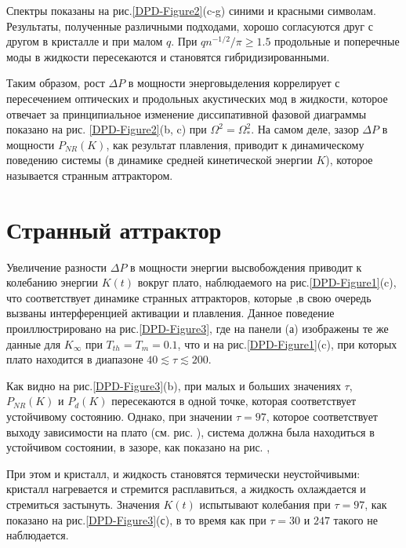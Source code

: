 Спектры показаны на рис.\ref{DPD-Figure2}(c-g) синими и красными символам. Результаты, полученные различными подходами, хорошо согласуются друг с другом
в кристалле и при малом $q$. При $qn^{-1/2} / \pi \geq 1.5$ продольные и поперечные моды в жидкости пересекаются и становятся гибридизированными. 

Таким образом, рост $\Delta P$ в мощности энерговыделения коррелирует с
пересечением оптических и продольных акустических мод в жидкости, которое отвечает за
принципиальное изменение диссипативной фазовой диаграммы показано на рис. \ref{DPD-Figure2}(b, c) при $\Omega^2 = \Omega^2_{*}$. 
На самом деле, зазор $\Delta P$ в мощности $P_{NR}(K)$, как результат плавления, приводит к  динамическому поведению системы (в динамике средней кинетической энергии $K$), которое называется странным аттрактором.



\section{Странный аттрактор}

Увеличение разности $\Delta P$ в мощности энергии высвобождения приводит к колебанию энергии $K(t)$  вокруг плато, наблюдаемого на рис.\ref{DPD-Figure1}(c), что соответствует динамике странных аттракторов, которые
,в свою очередь вызваны интерференцией активации и плавления. Данное поведение проиллюстрировано на рис.\ref{DPD-Figure3}, где на панели (а) изображены те же данные для $K_{\infty}$ при $T_{th} = T_m = 0.1$, что и на
рис.\ref{DPD-Figure1}(c), при которых плато находится в диапазоне $40 \lesssim \tau \lesssim 200$.

Как видно на рис.\ref{DPD-Figure3}(b), при малых и больших значениях $\tau$, $P_{NR}(K)$ и $P_{d}(K)$ пересекаются в одной точке, которая соответствует устойчивому состоянию. Однако, при значении $\tau = 97$, которое соответствует 
выходу зависимости на плато (см. рис. ), система должна была находиться в устойчивом состоянии, в зазоре, как показано на рис. , 

При этом и кристалл, и жидкость становятся термически неустойчивыми: кристалл нагревается и стремится расплавиться, а жидкость охлаждается и стремиться застынуть.
Значения $K(t)$ испытывают колебания при $\tau = 97$, как показано на рис.\ref{DPD-Figure3}(с), в то время как при $\tau = 30$ и $247$ такого не наблюдается. 

